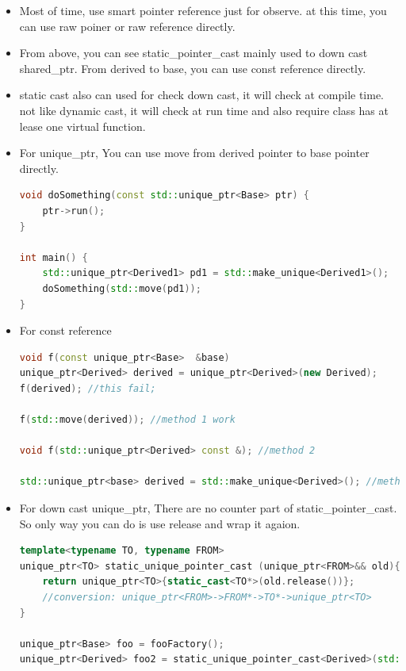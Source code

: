 \documentclass[a4paper,12pt,twoside]{book}
\begin{document}
\begin{itemize}
\item Most of time, use smart pointer reference just for observe. at this time, you can use raw poiner or raw reference directly. 

\item From above, you can see static\_pointer\_cast mainly used to down cast shared\_ptr. From derived to base, you can use const reference directly.

\item static cast also can used for check down cast, it will check at compile time. not like dynamic cast, it will check at run time and also require class has at lease one virtual function.


\item For unique\_ptr, You can use move from derived pointer to base pointer directly.
\begin{lstlisting}[frame=single, language=c++, mathescape=true]
void doSomething(const std::unique_ptr<Base> ptr) {
    ptr->run();
}

int main() {
    std::unique_ptr<Derived1> pd1 = std::make_unique<Derived1>();
    doSomething(std::move(pd1));
}
\end{lstlisting}

\item For const reference  
\begin{lstlisting}[frame=single, language=c++, mathescape=true]
void f(const unique_ptr<Base>  &base)
unique_ptr<Derived> derived = unique_ptr<Derived>(new Derived);
f(derived); //this fail;

f(std::move(derived)); //method 1 work

void f(std::unique_ptr<Derived> const &); //method 2

std::unique_ptr<base> derived = std::make_unique<Derived>(); //method 3
\end{lstlisting}

\item For down cast unique\_ptr, There are no counter part of static\_pointer\_cast. So only way you can do is use release and wrap it agaion.
	

\begin{lstlisting}[frame=single, language=c++, mathescape=true]
template<typename TO, typename FROM>
unique_ptr<TO> static_unique_pointer_cast (unique_ptr<FROM>&& old){
    return unique_ptr<TO>{static_cast<TO*>(old.release())};
    //conversion: unique_ptr<FROM>->FROM*->TO*->unique_ptr<TO>
}

unique_ptr<Base> foo = fooFactory();
unique_ptr<Derived> foo2 = static_unique_pointer_cast<Derived>(std::move(foo));
\end{lstlisting}
\end{itemize}
\end{document}
